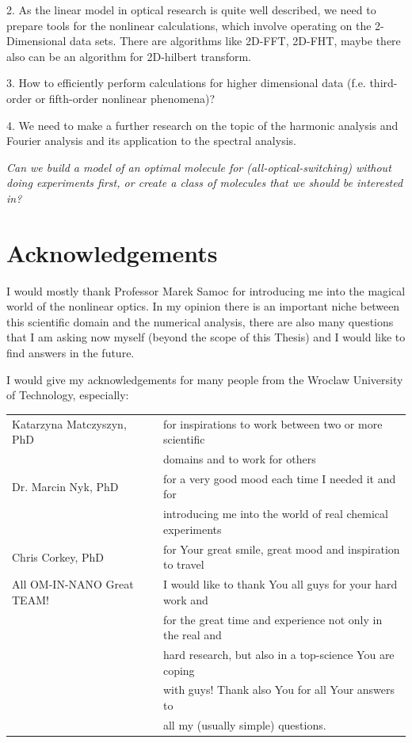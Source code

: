 \documentclass[12pt,twoside,a4paper]{article}
\numberwithin{equation}{subsection}
\numberwithin{figure}{subsection}
\begin{document}
2. As the linear model in optical research is quite well described, we need to prepare tools for the nonlinear calculations, which
involve operating on the 2-Dimensional data sets. There are algorithms like 2D-FFT, 2D-FHT, maybe there also can be an algorithm
for 2D-hilbert transform.

3. How to efficiently perform calculations for higher dimensional data (f.e. third-order or fifth-order nonlinear phenomena)?

4. We need to make a further research on the topic of the harmonic analysis and Fourier analysis and its application to the
spectral analysis.

\textit{Can we build a model of an optimal molecule for (all-optical-switching) without doing experiments first, or create a class
of molecules that we should be interested in?}

\section{Acknowledgements} \label{chap:acknowledgements}

I would mostly thank Professor Marek Samoc for introducing me into the magical world of the nonlinear optics. In my opinion there
is an important niche between this scientific domain and the numerical analysis, there are also many questions that I am asking now
myself (beyond the scope of this Thesis) and I would like to find answers in the future.


I would give my acknowledgements for many people from the Wroclaw University of Technology, especially:


\begin{tabular}{l l}
	Katarzyna Matczyszyn, PhD  & for inspirations to work between two or more scientific \\ 
							   & domains and to work for others \\ 
	Dr. Marcin Nyk, PhD        & for a very good mood each time I needed it and for \\
	                           & introducing me into the world of real chemical experiments \\
	Chris Corkey, PhD          & for Your great smile, great mood and inspiration to travel \\
	All OM-IN-NANO Great TEAM! & I would like to thank You all guys for your hard work and \\
	                           & for the great time and experience not only in the real and \\
	                           & hard research, but also in a top-science You are coping \\
	                           & with guys! Thank also You for all Your answers to \\ 
	                           & all my (usually simple) questions. \\
\end{tabular}
\end{document}
